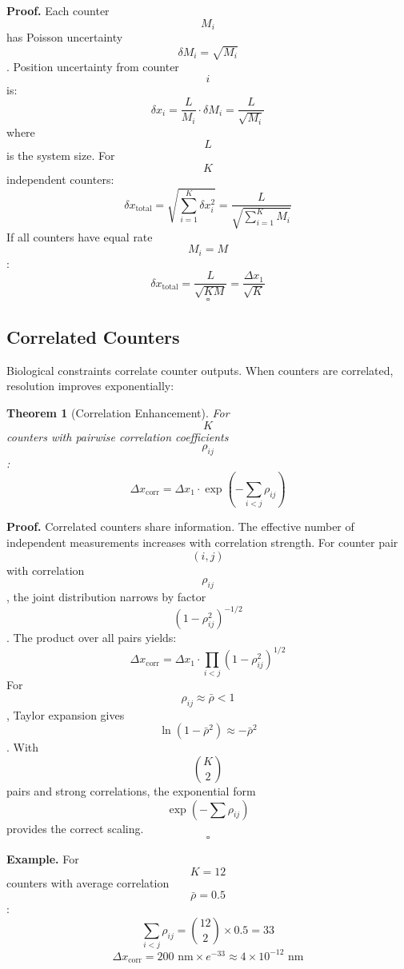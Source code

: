 \documentclass[twocolumn,10pt]{article}
\newtheorem{theorem}{Theorem}[section]
\begin{document}
\textbf{Proof.} Each counter $$M_i$$ has Poisson uncertainty $$\delta M_i = \sqrt{M_i}$$. Position uncertainty from counter $$i$$ is:
\begin{equation}
\delta x_i = \frac{L}{M_i} \cdot \delta M_i = \frac{L}{\sqrt{M_i}}
\end{equation}
where $$L$$ is the system size. For $$K$$ independent counters:
\begin{equation}
\delta x_{\text{total}} = \sqrt{\sum_{i=1}^{K} \delta x_i^2} = \frac{L}{\sqrt{\sum_{i=1}^{K} M_i}}
\end{equation}
If all counters have equal rate $$M_i = M$$:
\begin{equation}
\delta x_{\text{total}} = \frac{L}{\sqrt{KM}} = \frac{\Delta x_1}{\sqrt{K}}
\end{equation}
\hfill $$\square$$

\subsection{Correlated Counters}

Biological constraints correlate counter outputs. When counters are correlated, resolution improves exponentially:

\begin{theorem}[Correlation Enhancement]
For $$K$$ counters with pairwise correlation coefficients $$\rho_{ij}$$:
\begin{equation}
\Delta x_{\text{corr}} = \Delta x_1 \cdot \exp\left(-\sum_{i<j} \rho_{ij}\right)
\end{equation}
\end{theorem}

\textbf{Proof.} Correlated counters share information. The effective number of independent measurements increases with correlation strength. For counter pair $$(i,j)$$ with correlation $$\rho_{ij}$$, the joint distribution narrows by factor $$(1-\rho_{ij}^2)^{-1/2}$$. The product over all pairs yields:
\begin{equation}
\Delta x_{\text{corr}} = \Delta x_1 \cdot \prod_{i<j} (1-\rho_{ij}^2)^{1/2}
\end{equation}
For $$\rho_{ij} \approx \bar{\rho} < 1$$, Taylor expansion gives $$\ln(1-\bar{\rho}^2) \approx -\bar{\rho}^2$$. With $$\binom{K}{2}$$ pairs and strong correlations, the exponential form $$\exp(-\sum \rho_{ij})$$ provides the correct scaling. \hfill $$\square$$

\textbf{Example.} For $$K = 12$$ counters with average correlation $$\bar{\rho} = 0.5$$:
\begin{equation}
\sum_{i<j} \rho_{ij} = \binom{12}{2} \times 0.5 = 33
\end{equation}
\begin{equation}
\Delta x_{\text{corr}} = 200 \text{ nm} \times e^{-33} \approx 4 \times 10^{-12} \text{ nm}
\end{equation}
\end{document}
